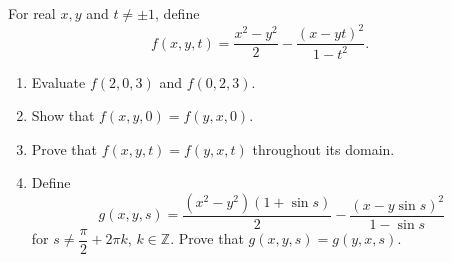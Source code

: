For real $x,y$ and $t\ne\pm1$, define
\[
f(x,y,t)=\dfrac{x^2-y^2}{2}-\dfrac{(x-yt)^2}{1-t^2}.
\]
\begin{enumerate}
\item Evaluate $f(2,0,3)$ and $f(0,2,3)$.
\item Show that $f(x,y,0)=f(y,x,0)$.
\item Prove that $f(x,y,t)=f(y,x,t)$ throughout its domain.
\item Define
\[
g(x,y,s)=\dfrac{(x^2-y^2)(1+\sin s)}{2}
-\dfrac{(x-y\sin s)^2}{1-\sin s}
\]
for $s\ne\dfrac{\pi}{2}+2\pi k$, $k\in\mathbb Z$. Prove that $g(x,y,s)=g(y,x,s)$.
\end{enumerate}

